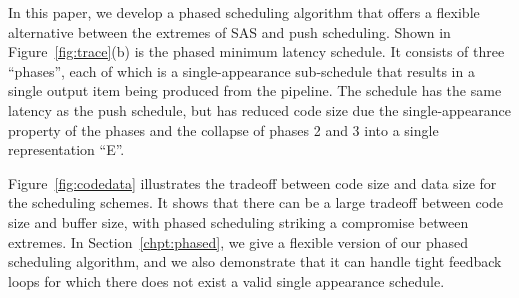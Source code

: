 In this paper, we develop a phased scheduling algorithm that offers a
flexible alternative between the extremes of SAS and push scheduling.
Shown in Figure~\ref{fig:trace}(b) is the phased minimum latency
schedule.  It consists of three ``phases'', each of which is a
single-appearance sub-schedule that results in a single output item
being produced from the pipeline.  The schedule has the same latency
as the push schedule, but has reduced code size due the
single-appearance property of the phases and the collapse of phases 2
and 3 into a single representation ``E''.

Figure~\ref{fig:codedata} illustrates the tradeoff between code size
and data size for the scheduling schemes.  It shows that there can be
a large tradeoff between code size and buffer size, with phased
scheduling striking a compromise between extremes.  In
Section~\ref{chpt:phased}, we give a flexible version of our phased
scheduling algorithm, and we also demonstrate that it can handle tight
feedback loops for which there does not exist a valid single
appearance schedule.

\begin{comment}
We can compare the storage efficiency of these two schedules by
assuming that one data item in a buffer requires $x$ amount of memory
and each entry in a schedule requires $y$ amount of memory.  Thus the
two schedules will require the same amount of storage to store
themselves and execute if $11 x + 18 y = 39 x + 4 y$.

\begin{displaymath}
\begin{array}{rcl}
11 x + 18 y & = & 39 x + 4 y \\
14 y & = & 28 x \\
y & = & 2x
\end{array}
\end{displaymath}

Thus the smaller schedule is more efficient if every data item
requires less than twice the amount of storage than every entry in
the schedule.

One of the difficulties in scheduling {\StreamIt} programs lies in
finding a good set of trade-offs between schedule size and
buffering requirements.
\end{comment}

